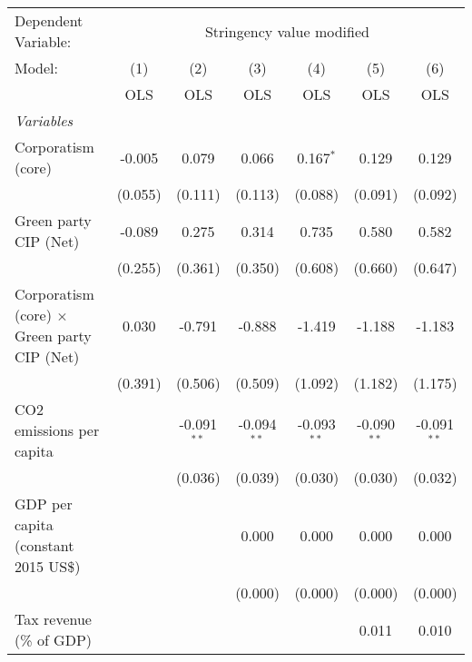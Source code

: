 
\begingroup
\centering
\begin{tabular}{lcccccc}
   \toprule
   Dependent Variable: & \multicolumn{6}{c}{Stringency value modified}\\
   Model:                                             & (1)     & (2)           & (3)           & (4)           & (5)           & (6)\\  
                                                      &  OLS    & OLS           & OLS           & OLS           & OLS           & OLS\\  
   \midrule
   \emph{Variables}\\
   Corporatism (core)                                 & -0.005  & 0.079         & 0.066         & 0.167$^{*}$   & 0.129         & 0.129\\   
                                                      & (0.055) & (0.111)       & (0.113)       & (0.088)       & (0.091)       & (0.092)\\   
   Green party CIP (Net)                              & -0.089  & 0.275         & 0.314         & 0.735         & 0.580         & 0.582\\   
                                                      & (0.255) & (0.361)       & (0.350)       & (0.608)       & (0.660)       & (0.647)\\   
   Corporatism (core) $\times$ Green party CIP (Net)  & 0.030   & -0.791        & -0.888        & -1.419        & -1.188        & -1.183\\   
                                                      & (0.391) & (0.506)       & (0.509)       & (1.092)       & (1.182)       & (1.175)\\   
   CO2 emissions per capita                           &         & -0.091$^{**}$ & -0.094$^{**}$ & -0.093$^{**}$ & -0.090$^{**}$ & -0.091$^{**}$\\   
                                                      &         & (0.036)       & (0.039)       & (0.030)       & (0.030)       & (0.032)\\   
   GDP per capita (constant 2015 US\$)                &         &               & 0.000         & 0.000         & 0.000         & 0.000\\   
                                                      &         &               & (0.000)       & (0.000)       & (0.000)       & (0.000)\\   
   Tax revenue (\% of GDP)                            &         &               &               &               & 0.011         & 0.010\\   

\end{tabular}
